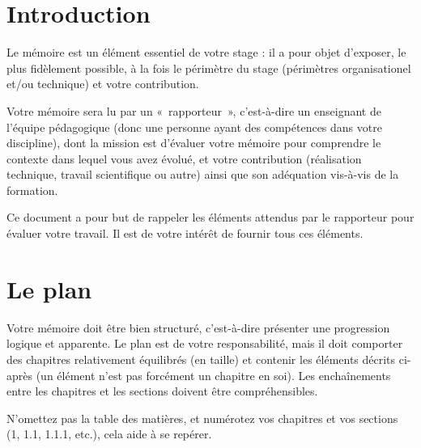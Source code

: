\documentclass [twoside,openright,a4paper,11pt,french] {report}
\begin{document}
{
    \parskip=0pt
    \tableofcontents
}

\cleardoublepage


\chapter {Introduction}
    \label {chap:intro}

Le mémoire est un élément essentiel de votre stage : il a pour objet
d'exposer, le plus fidèlement possible, à la fois le périmètre du
stage (périmètres organisationel et/ou technique) et votre contribution.

Votre mémoire sera lu par un «~rapporteur~», c'est-à-dire un
enseignant de l'équipe pédagogique (donc une personne ayant des
compétences dans votre discipline), dont la mission est d'évaluer votre
mémoire pour comprendre le contexte dans lequel vous avez évolué,
et votre contribution (réalisation technique, travail scientifique ou
autre) ainsi que son adéquation vis-à-vis de la formation.

Ce document a pour but de rappeler les éléments attendus par le
rapporteur pour évaluer votre travail. Il est de votre intérêt de
fournir tous ces éléments.



\chapter {Le plan}
    \label {chap:plan}

Votre mémoire doit être bien structuré, c'est-à-dire présenter une
progression logique et apparente. Le plan est de votre responsabilité,
mais il doit comporter des chapitres relativement équilibrés (en taille)
et contenir les éléments décrits ci-après (un élément n'est pas
forcément un chapitre en soi). Les enchaînements entre les chapitres
et les sections doivent être compréhensibles.

N'omettez pas la table des matières, et numérotez vos chapitres et
vos sections (1, 1.1, 1.1.1, etc.), cela aide à se repérer.
\end{document}

